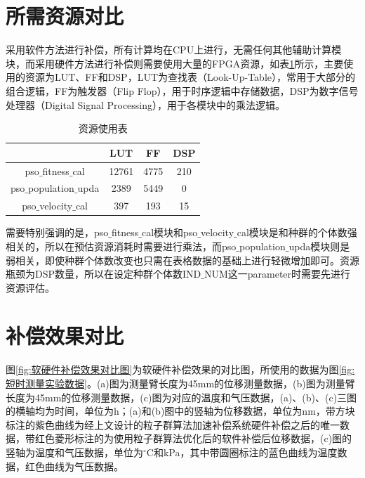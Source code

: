 \section{所需资源对比}
采用软件方法进行补偿，所有计算均在CPU上进行，无需任何其他辅助计算模块，而采用硬件方法进行补偿则需要使用大量的FPGA资源，如表\ref{tab:资源使用表}所示，主要使用的资源为LUT、FF和DSP，LUT为查找表（Look-Up-Table），常用于大部分的组合逻辑，FF为触发器（Flip Flop），用于时序逻辑中存储数据，DSP为数字信号处理器（Digital Signal Processing），用于各模块中的乘法逻辑。
\begin{table}[H]
  \centering
  \caption{资源使用表}
  \label{tab:资源使用表}
  \begin{tabular}{c|c|c|c}
      \hline
                                    & LUT        & FF        &DSP            \\ \hline
      pso$\_$fitness$\_$cal         & 12761      & 4775      & 210           \\ \hline
      pso$\_$population$\_$upda     & 2389       & 5449      & 0              \\ \hline
      pso$\_$velocity$\_$cal        & 397        & 193       & 15             \\ \hline
  \end{tabular}
\end{table}

需要特别强调的是，pso$\_$fitness$\_$cal模块和pso$\_$velocity$\_$cal模块是和种群的个体数强相关的，所以在预估资源消耗时需要进行乘法，而pso$\_$population$\_$upda模块则是弱相关，即使种群个体数改变也只需在表格数据的基础上进行轻微增加即可。资源瓶颈为DSP数量，所以在设定种群个体数IND$\_$NUM这一parameter时需要先进行资源评估。

\section{补偿效果对比}
图\ref{fig:软硬件补偿效果对比图}为软硬件补偿效果的对比图，所使用的数据为图\ref{fig:短时测量实验数据}。(a)图为测量臂长度为45mm的位移测量数据，(b)图为测量臂长度为45mm的位移测量数据，(c)图为对应的温度和气压数据，(a)、(b)、(c)三图的横轴均为时间，单位为h；(a)和(b)图中的竖轴为位移数据，单位为nm，带方块标注的紫色曲线为经上文设计的粒子群算法加速补偿系统硬件补偿之后的唯一数据，带红色菱形标注的为使用粒子群算法优化后的软件补偿后位移数据，(c)图的竖轴为温度和气压数据，单位为$^{\circ} \mathrm{C}$和kPa，其中带圆圈标注的蓝色曲线为温度数据，红色曲线为气压数据。

